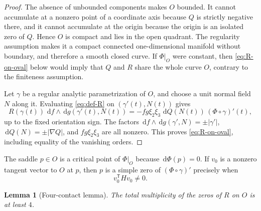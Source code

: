 \documentclass[10pt,reqno]{amsart}
\numberwithin{equation}{section}
\theoremstyle{plain}
\newtheorem{lemma}[theorem]{Lemma}
\theoremstyle{remark}
\newcommand{\dd}{\,\mathrm{d}}
\newcommand{\restr}[2]{#1\big|_{#2}}
\begin{document}
\begin{proof}
The absence of unbounded components makes $O$ bounded.  It cannot
accumulate at a nonzero point of a coordinate axis because $Q$ is
strictly negative there, and it cannot accumulate at the origin because
the origin is an isolated zero of $Q$.  Hence $O$ is compact and lies in
the open quadrant.  The regularity assumption makes it a compact
connected one-dimensional manifold without boundary, and therefore a
smooth closed curve.  If $\restr{\Phi}{O}$ were constant, then
\eqref{eq:R-on-oval} below would imply that $Q$ and $R$ share the whole
curve $O$, contrary to the finiteness assumption.

Let $\gamma$ be a regular analytic parametrization of $O$, and choose a
unit normal field $N$ along it.  Evaluating \eqref{eq:def-R} on
$(\gamma'(t),N(t))$ gives
\begin{equation}\label{eq:wedge-on-oval}
 R(\gamma(t))\,\dd f\wedge\dd g(\gamma'(t),N(t))
 =-fg\xi_2\xi_3\,\dd Q(N(t))\,(\Phi\circ\gamma)'(t),
\end{equation}
up to the fixed orientation sign.  The factors
$\dd f\wedge\dd g(\gamma',N)=\pm\lvert\gamma'\rvert$,
$\dd Q(N)=\pm\lvert\nabla Q\rvert$, and $fg\xi_2\xi_3$ are all
nonzero.  This proves \eqref{eq:R-on-oval}, including equality of the
vanishing orders.
\end{proof}

The saddle $p\in O$ is a critical point of $\restr{\Phi}{O}$ because
$\dd\Phi(p)=0$.  If $v_0$ is a nonzero tangent vector to $O$ at $p$, then
$p$ is a simple zero of $(\Phi\circ\gamma)'$ precisely when
\begin{equation}\label{eq:tangent-Hessian}
  v_0^{\mathsf T}Hv_0\neq0.
\end{equation}

\begin{lemma}[Four-contact lemma]\label{lem:four-contacts}
The total multiplicity of the zeros of $R$ on $O$ is at least $4$.
\end{lemma}
\end{document}
